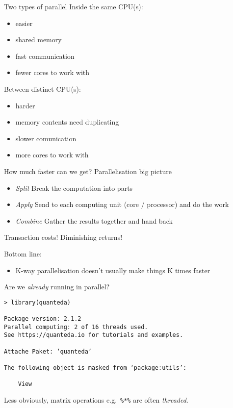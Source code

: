 \documentclass{hertieteaching}
\begin{document}
\begin{frame}{Two types of parallel}
\protect\hypertarget{two-types-of-parallel}{}
Inside the same CPU(s):

\begin{itemize}

\item
  easier
\item
  shared memory
\item
  fast communication
\item
  fewer cores to work with
\end{itemize}

Between distinct CPU(s):

\begin{itemize}

\item
  harder
\item
  memory contents need duplicating
\item
  slower comunication
\item
  more cores to work with
\end{itemize}
\end{frame}


\begin{frame}{How much faster can we get?}
\protect\hypertarget{how-much-faster-can-we-get}{}
Parallelisation big picture

\begin{itemize}

\item
  \emph{Split} Break the computation into parts
\item
  \emph{Apply} Send to each computing unit (core / processor) and do the
  work
\item
  \emph{Combine} Gather the results together and hand back
\end{itemize}

Transaction costs! Diminishing returns!

\pause

Bottom line: 
\begin{itemize}
  \item K-way parallelisation doesn't usually make things K times faster
\end{itemize}

\end{frame}

\begin{frame}[fragile]{Are we \emph{already} running in parallel?}

\begin{verbatim}
> library(quanteda)

Package version: 2.1.2
Parallel computing: 2 of 16 threads used.
See https://quanteda.io for tutorials and examples.

Attache Paket: ‘quanteda’

The following object is masked from ‘package:utils’:

    View  
\end{verbatim}

\normalsize

Less obviously, matrix operations e.g.~\texttt{\%*\%} are often
\emph{threaded}.
\end{frame}
\end{document}
